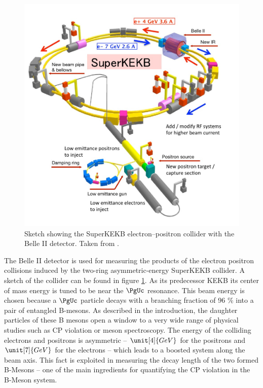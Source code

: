 \begin{figure}
 \centering
 \includegraphics[height=0.4\textheight]{figures/experimental_setup/superkekb.jpg}
 \caption[Sketch showing the SuperKEKB electron--positron collider.]{Sketch showing the SuperKEKB electron--positron collider with the Belle II detector. Taken from \cite{DesyWebseite}.}
 \label{fig-superkekb}
\end{figure}


The Belle II detector is used for measuring the products of the electron positron collisions induced by the two-ring asymmetric-energy SuperKEKB collider. A sketch of the collider can be found in figure \ref{fig-superkekb}. As its predecessor KEKB its center of mass energy is tuned to be near the $\PgUc$ resonance. This beam energy is chosen because a $\PgUc$ particle decays with a branching fraction of 96 \% into a pair of entangled B-mesons. As described in the introduction, the daughter particles of these B mesons open a window to a very wide range of physical studies such as CP violation or meson spectroscopy. The energy of the colliding electrons and positrons is asymmetric -- $\unit[4]{GeV}$ for the positrons and $\unit[7]{GeV}$ for the electrons -- which leads to a boosted system along the beam axis. This fact is exploited in measuring the decay length of the two formed B-Mesons -- one of the main ingredients for quantifying the CP violation in the B-Meson system. 

